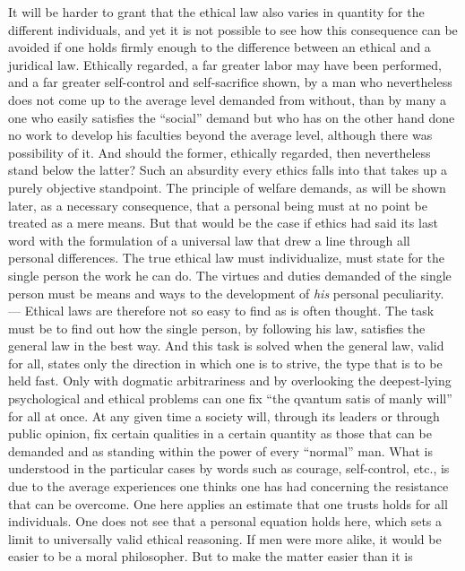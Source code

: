 \documentclass[12pt,a4paper,openany]{book}
\newcommand{\opage}[1]{\marginnote{\footnotesize\textit{[#1]}}}
\begin{document}
It will be harder to grant that the ethical law also varies in quantity for the different individuals,
and yet it is not possible to see how this consequence can be avoided if one holds firmly enough to the
difference between an ethical and a juridical law. Ethically regarded, a far greater labor may have been
performed, and a far greater self-control and self-sacrifice shown, by a man who nevertheless does not
come up to the average level demanded from without, than by many a one who easily satisfies the
``social'' demand but who has on the other hand done no work to develop his faculties beyond the
average level, although there was possibility of it. And should the former, ethically regarded, then
nevertheless stand below the latter? Such an absurdity
\opage{91}every ethics falls into that takes up a purely objective standpoint. The principle of welfare
demands, as will be shown later, as a necessary consequence, that a personal being must at no point be
treated as a mere means. But that would be the case if ethics had said its last word with the
formulation of a universal law that drew a line through all personal differences. The true ethical law
must individualize, must state for the single person the work he can do. The virtues and duties
demanded of the single person must be means and ways to the development of \textit{his} personal
peculiarity. --- Ethical laws are therefore not so easy to find as is often thought. The task must be to
find out how the single person, by following his law, satisfies the general law in the best way. And
this task is solved when the general law, valid for all, states only the direction in which one is to
strive, the type that is to be held fast. Only with dogmatic arbitrariness and by overlooking the
deepest-lying psychological and ethical problems can one fix ``the qvantum satis of manly will'' for all
at once. At any given time a society will, through its leaders or through public opinion, fix certain
qualities in a certain quantity as those that can be demanded and as standing within the power of every
``normal'' man. What is understood in the particular cases by words such as courage, self-control,
etc., is due to the average experiences one thinks one has had concerning the resistance that can be
overcome. One here applies an estimate that one trusts holds for all individuals. One does not see that
a personal equation holds here, which sets a limit to universally valid ethical reasoning. If men were
more alike, it would be easier to be a moral philosopher. But to make the matter easier than it is
\end{document}
